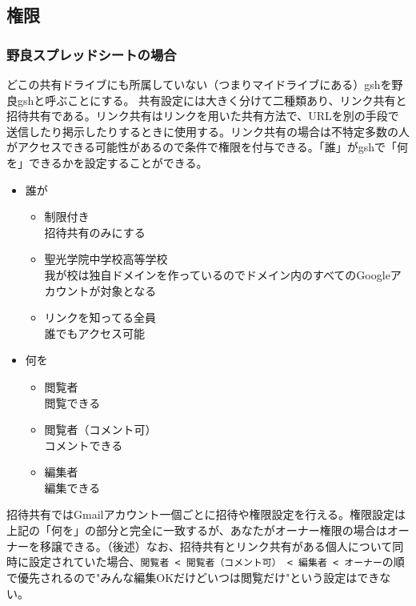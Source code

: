 \documentclass[dvipdfmx,jb5]{jreport}
\newcommand{\terlogy}[2][|]{\colorbox{terlogy}{\texttt{\lstinline#1#2#1}}}
\begin{document}
\subsection{権限}
\subsubsection{野良スプレッドシートの場合}
どこの共有ドライブにも所属していない（つまりマイドライブにある）gshを野良gshと呼ぶことにする。
共有設定には大きく分けて二種類あり、リンク共有と招待共有である。リンク共有はリンクを用いた共有方法で、URLを別の手段で送信したり掲示したりするときに使用する。リンク共有の場合は不特定多数の人がアクセスできる可能性があるので条件で権限を付与できる。「誰」がgshで「何を」できるかを設定することができる。
\begin{itemize}
      \item 誰が
            \begin{itemize}
                  \item 制限付き\\
                        招待共有のみにする
                  \item 聖光学院中学校高等学校\\
                        我が校は独自ドメインを作っているのでドメイン内のすべてのGoogleアカウントが対象となる
                  \item リンクを知ってる全員\\
                        誰でもアクセス可能
            \end{itemize}
      \item 何を
            \begin{itemize}
                  \item 閲覧者\\
                        閲覧できる
                  \item 閲覧者（コメント可）\\
                        コメントできる
                  \item 編集者\\
                        編集できる
            \end{itemize}
\end{itemize}
招待共有ではGmailアカウント一個ごとに招待や権限設定を行える。権限設定は上記の「何を」の部分と完全に一致するが、あなたがオーナー権限の場合はオーナーを移譲できる。（後述）なお、招待共有とリンク共有がある個人について同時に設定されていた場合、\terlogy{閲覧者 < 閲覧者（コメント可） < 編集者 < オーナー}の順で優先されるので"みんな編集OKだけどいつは閲覧だけ"という設定はできない。
\\
\end{document}

